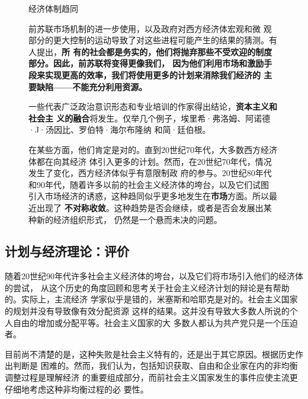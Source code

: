 \begin{figure}[ht] \centering
  \begin{mybox}{经济体制趋同}
    \begin{multicols}{2}前苏联市场机制的进一步使用，以及政府对西方经济体宏观和微
观部分的更大控制的运动导致了对这些进程可能产生的结果的猜测。有人提出，\textbf{所
有的社会都是务实的，他们将抛弃那些不受欢迎的制度部分。因此，前苏联将变得更像我们，
因为他们利用市场和激励手段来实现更高的效率，我们将使用更多的计划来消除我们经济的
主要缺陷——不能充分利用资源。}

      一些代表广泛政治意识形态和专业培训的作家得出结论，\textbf{资本主义和社会主
义的融合}将发生。仅举几个例子，埃里希·弗洛姆、阿诺德·J·汤因比、罗伯特·海尔布隆纳
和简·廷伯根。

      在某些方面，他们肯定是对的。直到20世纪70年代，大多数西方经济体都在向其经济
体引入更多的计划。然而，在20世纪70年代，情况发生了变化，西方经济体似乎有意限制政
府的参与。20世纪80年代和90年代，随着许多以前的社会主义经济体的垮台，以及它们试图
引入市场经济的诱惑，这种趋同似乎更多地发生在\textbf{市场}方面。所以最近出现了
\textbf{不对称收敛}。这种趋势是否会继续，或者是否会发展出某种新的经济组织形式，
仍然是一个悬而未决的问题。
    \end{multicols}
  \end{mybox}
\end{figure}

\subsection{计划与经济理论：评价}

随着20世纪90年代许多社会主义经济体的垮台，以及它们将市场引入他们的经济体的尝试，
从这个历史的角度回顾和思考关于社会主义经济计划的辩论是有帮助的。实际上，主流经济
学家似乎是错的，米塞斯和哈耶克是对的。社会主义国家的规划并没有导致像有效分配资源
这样的结果。这并没有导致大多数人所说的个人自由的增加或分配平等。社会主义国家的大
多数人都认为共产党只是一个压迫者。

目前尚不清楚的是，这种失败是社会主义特有的，还是出于其它原因。根据历史作出判断是
困难的。然而，我们认为，包括知识获取、自由和企业家在内的非均衡调整过程是理解经济
的重要组成部分，而前社会主义国家发生的事件应使主流更仔细地考虑这种非均衡过程的必
要性。


